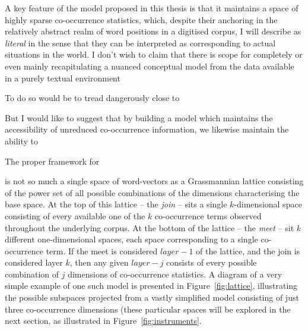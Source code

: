A key feature of the model proposed in this thesis is that it maintains a space of highly sparse co-occurrence statistics, which, despite their anchoring in the relatively abstract realm of word positions in a digitised corpus, I will describe as \emph{literal} in the sense that they can be interpreted as corresponding to actual situations in the world.  I don't wish to claim that there is scope for completely or even mainly recapitulating a nuanced conceptual model from the data available in a purely textual environment

To do so would be to tread dangerously close to 

But I would like to suggest that by building a model which maintains the accessibility of unreduced co-occurrence information, we likewise maintain the ability to 

The proper framework for 

is not so much a single space of word-vectors as a Grassmannian lattice consisting of the power set of all possible combinations of the dimensions characterising the base space.  At the top of this lattice -- the \emph{join} -- sits a single $k$-dimensional space consisting of every available one of the $k$ co-occurrence terms observed throughout the underlying corpus.  At the bottom of the lattice -- the \emph{meet} -- sit $k$ different one-dimensional spaces, each space corresponding to a single co-occurrence term.  If the meet is considered $layer-1$ of the lattice, and the join is considered layer $k$, then any given $layer-j$ consists of every possible combination of $j$ dimensions of co-occurrence statistics.  A diagram of a very simple example of one such model is presented in Figure~\ref{fig:lattice}, illustrating the possible subspaces projected from a vastly simplified model consisting of just three co-occurrence dimensions (these particular spaces will be explored in the next section, as illustrated in Figure~\ref{fig:instruments}.

